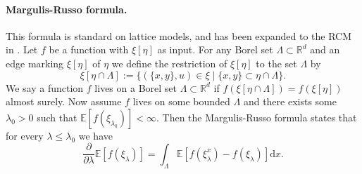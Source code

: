 \documentclass[a4paper,12pt]{scrartcl}
\newcommand{\E}{\mathbb{E}}
\renewcommand{\d}{\mathrm{d}}
\newcommand{\reals}{\mathbb{R}}
\newcommand{\del}{\partial}
\newcommand{\set}[2]{\big\{ #1 \mid #2 \big\}}
\theoremstyle{definition}
\theoremstyle{remark}
\begin{document}
\paragraph{Margulis-Russo formula.}\label{par:Margulis}
This formula is standard on lattice models, and has been expanded to the RCM in \cite{LastZiescheStationary}. Let $f$ be a function with $\xi[\eta]$ as input. For any Borel set $\Lambda\subset\reals^d$ and an edge marking $\xi[\eta]$ of $\eta$ we define the restriction of $\xi[\eta]$ to the set $\Lambda$ by
$$
\xi[\eta\cap \Lambda] :=
\set{
  (\{ x, y\}, u) \in\xi
}{ \{x,y\}\subset \eta\cap \Lambda
}.
$$
We say a function $f$ lives on a Borel set $\Lambda\subset \reals^d$ if $f(\xi[\eta\cap\Lambda])=f(\xi[\eta])$ almost surely.  Now assume $f$ lives on some bounded $\Lambda$ and there exists some $\lambda_0>0$ such that $\E[f(\xi_{\lambda_0})]<\infty$. Then the Margulis-Russo formula states that for every $\lambda\leq \lambda_0$ we have
$$
\frac{\del}{\del\lambda} \E[f(\xi_{\lambda})]=
\int_{\Lambda}
\E[f(\xi^x_{\lambda}) - f(\xi_{\lambda})]\d x.
$$
\end{document}

